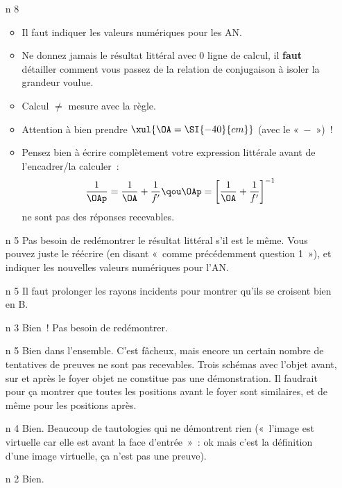 \documentclass[a4paper, 11pt, final, garamond]{book}
\begin{document}
\begin{enumerate}[label=\sqenumi]
  \item[n]{8}%
    \vspace{-22pt}
    \begin{itemize}
      \item Il faut indiquer les valeurs numériques pour les AN.
      \item Ne donnez jamais le résultat littéral avec 0 ligne de calcul, il
        \textbf{faut} détailler comment vous passez de la relation de
        conjugaison à isoler la grandeur voulue.
      \item Calcul $\neq$ mesure avec la règle.
      \item Attention à bien prendre $\xul{\OA = \SI{-40}{cm}}$ (avec le
        «~$-$~»)~!
      \item Pensez bien à écrire complètement votre expression littérale avant
        de l'encadrer/la calculer~:
        \[
          \frac{1}{\OAp} = \frac{1}{\OA} + \frac{1}{f'}
          \qou
          \OAp = \left[\frac{1}{\OA} + \frac{1}{f'}\right]^{-1}
        \]
        ne sont pas des réponses recevables.
    \end{itemize}
  \item[n]{5}%
    Pas besoin de redémontrer le résultat littéral s'il est le même. Vous pouvez
    juste le réécrire (en disant «~comme précédemment question 1~»), et indiquer
    les nouvelles valeurs numériques pour l'AN.
  \item[n]{5}%
    Il faut prolonger les rayons incidents pour montrer qu'ils se croisent bien
    en B.
  \item[n]{3}%
    Bien~! Pas besoin de redémontrer.
  \item[n]{5}%
    Bien dans l'ensemble. C'est fâcheux, mais encore un certain nombre de
    tentatives de preuves ne sont pas recevables. Trois schémas avec l'objet
    avant, sur et après le foyer objet ne constitue pas une démonstration. Il
    faudrait pour ça montrer que toutes les positions avant le foyer sont
    similaires, et de même pour les positions après.
  \item[n]{4}%
    Bien. Beaucoup de tautologies qui ne démontrent rien («~l'image est
    virtuelle car elle est avant la face d'entrée~»~: ok mais c'est la
    définition d'une image virtuelle, ça n'est pas une preuve).
  \item[n]{2}%
    Bien.
\end{enumerate}
\end{document}
